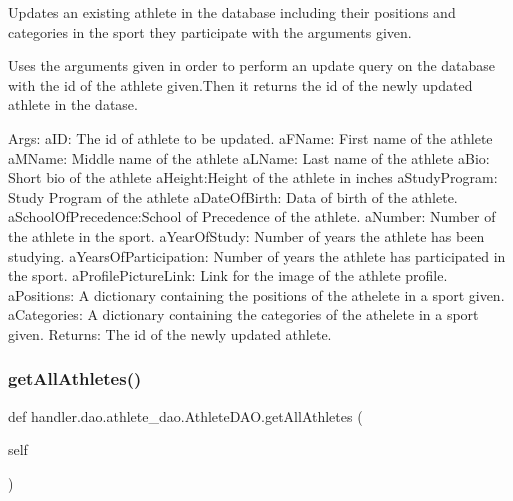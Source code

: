 \begin{DoxyVerb}Updates an existing athlete in the database
including their positions and categories in
the sport they participate with the arguments
given.

Uses the arguments given in order to perform an update query on 
the database with the id of the athlete given.Then it returns
the id of the newly updated athlete in the datase.

Args:
    aID: The id of athlete to be updated.
    aFName: First name of the athlete
    aMName: Middle name of the athlete
    aLName: Last name of the athlete
    aBio: Short bio of the athlete
    aHeight:Height of the athlete in inches
    aStudyProgram: Study Program of the athlete
    aDateOfBirth: Data of birth of the athlete.
    aSchoolOfPrecedence:School of Precedence of the athlete.
    aNumber: Number of the athlete in the sport.
    aYearOfStudy: Number of years the athlete has been studying.
    aYearsOfParticipation: Number of years the athlete has participated in the sport.
    aProfilePictureLink: Link for the image of the athlete profile.
    aPositions: A dictionary containing the positions of the athelete in 
        a sport given.
    aCategories: A dictionary containing the categories of the athelete in 
         a sport given.
Returns:
    The id of the newly updated athlete.
\end{DoxyVerb}
 \mbox{\label{classhandler_1_1dao_1_1athlete__dao_1_1_athlete_d_a_o_a20c2fea97ed691d3c9459cb8bf13f962}} 
\subsubsection{\texorpdfstring{get\+All\+Athletes()}{getAllAthletes()}}
{\footnotesize\ttfamily def handler.\+dao.\+athlete\+\_\+dao.\+Athlete\+D\+A\+O.\+get\+All\+Athletes (\begin{DoxyParamCaption}\item[{}]{self }\end{DoxyParamCaption})}

